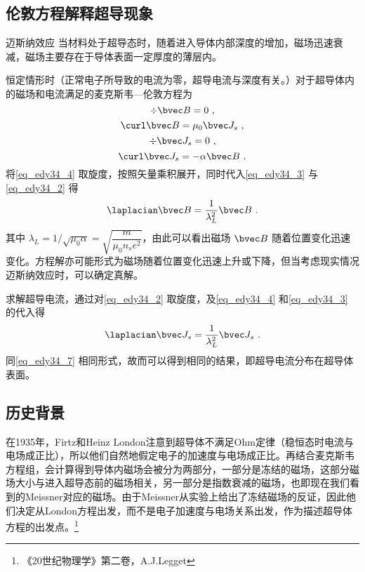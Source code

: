 \subsection{伦敦方程解释超导现象}\label{sub_edy34_1}
\begin{theorem}{迈斯纳效应}
当材料处于超导态时，随着进入导体内部深度的增加，磁场迅速衰减，磁场主要存在于导体表面一定厚度的薄层内。
\end{theorem}
恒定情形时（正常电子所导致的电流为零，超导电流与深度有关。）对于超导体内的磁场和电流满足的麦克斯韦—伦敦方程为
\begin{equation}
\div \bvec B=0\label{eq_edy34_3}~,
\end{equation}
\begin{equation}
\curl \bvec B=\mu_0 \bvec J_s\label{eq_edy34_4}~,
\end{equation}
\begin{equation}
\div \bvec J_s=0\label{eq_edy34_5}~,
\end{equation}
\begin{equation}
\curl \bvec J_s=-\alpha\bvec B~.
\end{equation}
将\autoref{eq_edy34_4} 取旋度，按照矢量乘积展开，同时代入\autoref{eq_edy34_3} 与\autoref{eq_edy34_2} 得
\begin{equation}
\laplacian \bvec B=\dfrac{1}{\lambda_L^2}\bvec B \label{eq_edy34_7}~.
\end{equation}
其中 $\lambda_L= 1/\sqrt{\mu_0\alpha}=\sqrt{\dfrac m {\mu_0n_se^2}}$，由此可以看出磁场 $\bvec B$ 随着位置变化迅速变化。方程解亦可能形式为磁场随着位置变化迅速上升或下降，但当考虑现实情况迈斯纳效应时，可以确定真解。

求解超导电流，通过对\autoref{eq_edy34_2} 取旋度，及\autoref{eq_edy34_4} 和\autoref{eq_edy34_3} 的代入得
\begin{equation}
\laplacian\bvec J_s=\dfrac 1 {\lambda_L^2}\bvec J_s~.
\end{equation}
同\autoref{eq_edy34_7} 相同形式，故而可以得到相同的结果，即超导电流分布在超导体表面。

\subsection{历史背景}
在1935年，Firtz和Heinz London注意到超导体不满足Ohm定律（稳恒态时电流与电场成正比），所以他们自然地假定电子的加速度与电场成正比。再结合麦克斯韦方程组，会计算得到导体内磁场会被分为两部分，一部分是冻结的磁场，这部分磁场大小与进入超导态前的磁场相关，另一部分是指数衰减的磁场，也即现在我们看到的Meissner对应的磁场。由于Meissner从实验上给出了冻结磁场的反证，因此他们决定从London方程出发，而不是电子加速度与电场关系出发，作为描述超导体方程的出发点。\footnote{《20世纪物理学》第二卷，A.J.Legget}

